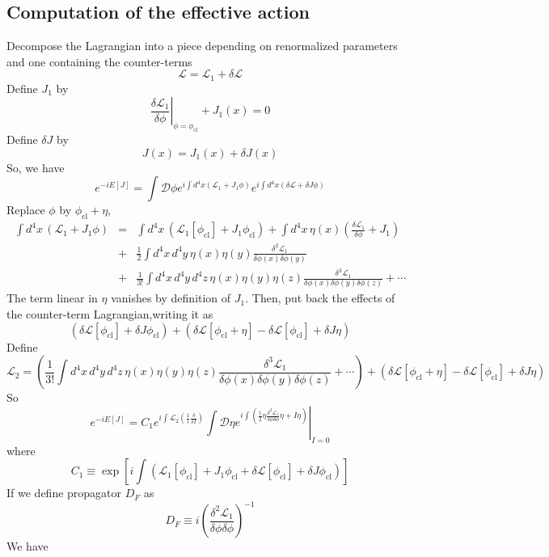 \documentclass[cyan]{elegantnote}
\begin{document}
\subsection{Computation of the effective action}
\noindent
Decompose the Lagrangian into a piece depending on renormalized parameters and one containing the counter-terms
\[\mathcal{L} = \mathcal{L}_1 + \delta \mathcal{L}\]
Define $J_1$ by
\[\left. \frac{\delta \mathcal{L}_1}{\delta \phi} \right|_{\phi = \phi_{\mathrm{cl}}} + J_1(x) = 0\]
Define $\delta J$ by
\[J(x) = J_1(x) + \delta J(x)\]
So, we have
\[e^{-iE[J]} = \int \mathcal{D}\phi e^{i\int d^4x (\mathcal{L}_1 + J_1\phi)} e^{i\int d^4x (\delta \mathcal{L} + \delta J \phi)}\]
Replace $\phi$ by $\phi_{\mathrm{cl}}+\eta$,
\begin{eqnarray}
\int d^4x \, (\mathcal{L}_1 + J_1\phi) &=& \int d^4x \, (\mathcal{L}_1[\phi_{\mathrm{cl}}] + J_1\phi_{\mathrm{cl}}) + \int d^4x \, \eta(x) \left( \frac{\delta \mathcal{L}_1}{\delta \phi} + J_1 \right) \nonumber \\
&+& \frac{1}{2} \int d^4x \, d^4y \, \eta(x) \eta(y) \frac{\delta^2 \mathcal{L}_1}{\delta \phi(x) \delta \phi(y)} \nonumber \\
&+& \frac{1}{3!} \int d^4x \, d^4y \, d^4z \, \eta(x) \eta(y) \eta(z) \frac{\delta^3 \mathcal{L}_1}{\delta \phi(x) \delta \phi(y) \delta \phi(z)} + \cdots \nonumber
\end{eqnarray}
The term linear in $\eta$ vanishes by definition of $J_1$. 
Then, put back the effects of the counter-term Lagrangian,writing it as
\[(\delta \mathcal{L}[\phi_{\mathrm{cl}}] + \delta J \phi_{\mathrm{cl}} ) + ( \delta \mathcal{L}[\phi_{\mathrm{cl}} + \eta] - \delta\mathcal{L} [\phi_{\mathrm{cl}}] + \delta J \eta)\]
Define
\[\mathcal{L}_2 = \left(\frac{1}{3!} \int d^4x \, d^4y \, d^4z \, \eta(x) \eta(y) \eta(z) \frac{\delta^3 \mathcal{L}_1}{\delta \phi(x) \delta \phi(y) \delta \phi(z)} + \cdots \right) + ( \delta \mathcal{L}[\phi_{\mathrm{cl}} + \eta] - \delta\mathcal{L} [\phi_{\mathrm{cl}}] + \delta J \eta)\]
So
\[e^{-iE[J]} = C_1 e^{i\int \mathcal{L}_2(\frac{1}{i} \frac{\delta}{\delta I})} \left. \int \mathcal{D}\eta e^{i\int \left(\frac{1}{2} \eta \frac{\delta^2 \mathcal{L}_1}{\delta \phi \delta \phi} \eta + I\eta \right)} \right|_{I=0}\]
where
\[C_1 \equiv \exp \left[ i \int ( \mathcal{L}_1 [\phi_{\mathrm{cl}}] + J_1\phi_{\mathrm{cl}} + \delta \mathcal{L}[\phi_{\mathrm{cl}}] + \delta J \phi_{\mathrm{cl}} )\right]\]
If we define propagator $D_F$ as
\[D_F \equiv i \left( \frac{\delta^2 \mathcal{L}_1}{\delta \phi \delta \phi}\right)^{-1}\]
We have
\end{document}
